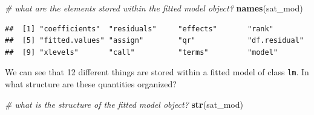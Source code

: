 \documentclass[
]{book}
\newenvironment{Shaded}{\begin{snugshade}}{\end{snugshade}}
\newcommand{\CommentTok}[1]{\textcolor[rgb]{0.56,0.35,0.01}{\textit{#1}}}
\newcommand{\KeywordTok}[1]{\textcolor[rgb]{0.13,0.29,0.53}{\textbf{#1}}}
\newcommand{\NormalTok}[1]{#1}
\begin{document}
\begin{Shaded}
\begin{Highlighting}[]
  \CommentTok{\# what are the elements stored within the fitted model object?}
  \KeywordTok{names}\NormalTok{(sat\_mod)}
\end{Highlighting}
\end{Shaded}

\begin{verbatim}
##  [1] "coefficients"  "residuals"     "effects"       "rank"         
##  [5] "fitted.values" "assign"        "qr"            "df.residual"  
##  [9] "xlevels"       "call"          "terms"         "model"
\end{verbatim}

We can see that 12 different things are stored within a fitted model of class \texttt{lm}. In what structure are these quantities organized?

\begin{Shaded}
\begin{Highlighting}[]
  \CommentTok{\# what is the structure of the fitted model object?}
  \KeywordTok{str}\NormalTok{(sat\_mod)}
\end{Highlighting}
\end{Shaded}
\end{document}
